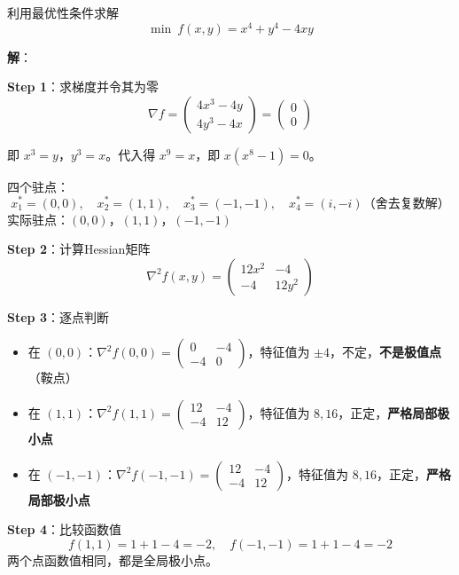 \begin{example}[利用最优性条件求解]\label{ex:optimality1}
利用最优性条件求解
\[
\min\ f(x, y) = x^4 + y^4 - 4xy
\]

\textbf{解}：

\textbf{Step 1}：求梯度并令其为零
\[
\nabla f = \begin{pmatrix} 4x^3 - 4y \\ 4y^3 - 4x \end{pmatrix} = \begin{pmatrix} 0 \\ 0 \end{pmatrix}
\]

即 $x^3 = y$，$y^3 = x$。代入得 $x^9 = x$，即 $x(x^8 - 1) = 0$。

四个驻点：
\[
x_1^* = (0, 0),\quad x_2^* = (1, 1),\quad x_3^* = (-1, -1),\quad x_4^* = (i, -i) \text{（舍去复数解）}
\]
实际驻点：$(0,0)$，$(1,1)$，$(-1,-1)$

\textbf{Step 2}：计算Hessian矩阵
\[
\nabla^2 f(x, y) = \begin{pmatrix} 12x^2 & -4 \\ -4 & 12y^2 \end{pmatrix}
\]

\textbf{Step 3}：逐点判断
\begin{itemize}
    \item 在 $(0, 0)$：$\nabla^2 f(0,0) = \begin{pmatrix} 0 & -4 \\ -4 & 0 \end{pmatrix}$，特征值为 $\pm 4$，不定，\textbf{不是极值点}（鞍点）
    \item 在 $(1, 1)$：$\nabla^2 f(1,1) = \begin{pmatrix} 12 & -4 \\ -4 & 12 \end{pmatrix}$，特征值为 $8, 16$，正定，\textbf{严格局部极小点}
    \item 在 $(-1, -1)$：$\nabla^2 f(-1,-1) = \begin{pmatrix} 12 & -4 \\ -4 & 12 \end{pmatrix}$，特征值为 $8, 16$，正定，\textbf{严格局部极小点}
\end{itemize}

\textbf{Step 4}：比较函数值
\[
f(1,1) = 1 + 1 - 4 = -2,\quad f(-1,-1) = 1 + 1 - 4 = -2
\]
两个点函数值相同，都是全局极小点。
\end{example}

